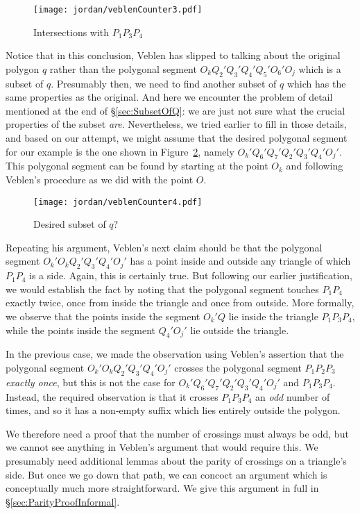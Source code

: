 \begin{figure}
\centering
\texttt{[image: jordan/veblenCounter3.pdf]}
\caption{Intersections with $P_1P_3P_4$}
\label{fig:VeblenCounter3}
\end{figure}

Notice that in this conclusion, Veblen has slipped to talking about the original polygon $q$ rather than the polygonal segment $O_kQ_2'Q_3'Q_4'Q_5'O_6'O_j$ which is a subset of $q$. Presumably then, we need to find another subset of $q$ which has the same properties as the original. And here we encounter the problem of detail mentioned at the end of \S\ref{sec:SubsetOfQ}: we are just not sure what the crucial properties of the subset \emph{are}. Nevertheless, we tried earlier to fill in those details, and based on our attempt, we might assume that the desired polygonal segment for our example is the one shown in Figure~\ref{fig:VeblenCounter4}, namely $O_k'Q_6'Q_7'Q_2'Q_3'Q_4'O_j'$. This polygonal segment can be found by starting at the point $O_k$ and following Veblen's procedure as we did with the point $O$. 

\begin{figure}
\centering
\texttt{[image: jordan/veblenCounter4.pdf]}
\caption{Desired subset of $q$?}
\label{fig:VeblenCounter4}
\end{figure}

Repeating his argument, Veblen's next claim should be that the polygonal segment $O_k'O_kQ_2'Q_3'Q_4'O_j'$ has a point inside and outside any triangle of which $P_1P_4$ is a side. Again, this is certainly true. But following our earlier justification, we would establish the fact by noting that the polygonal segment touches $P_1P_4$ exactly twice, once from inside the triangle and once from outside. More formally, we observe that the points inside the segment $O_k'Q$ lie inside the triangle $P_1P_3P_4$, while the points inside the segment $Q_4'O_j'$ lie outside the triangle. 

In the previous case, we made the observation using Veblen's assertion that the polygonal segment $O_k'O_kQ_2'Q_3'Q_4'O_j'$ crosses the polygonal segment $P_1P_2P_3$ \emph{exactly once}, but this is not the case for $O_k'Q_6'Q_7'Q_2'Q_3'Q_4'O_j'$ and $P_1P_3P_4$. Instead, the required observation is that it crosses $P_1P_3P_4$ an \emph{odd} number of times, and so it has a non-empty suffix which lies entirely outside the polygon.

We therefore need a proof that the number of crossings must always be odd, but we cannot see anything in Veblen's argument that would require this. We presumably need additional lemmas about the parity of crossings on a triangle's side. But once we go down that path, we can concoct an argument which is conceptually much more straightforward. We give this argument in full in \S\ref{sec:ParityProofInformal}.

